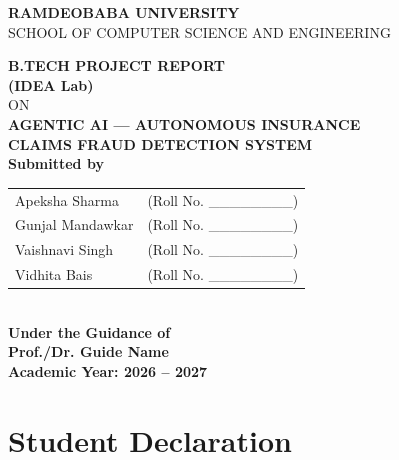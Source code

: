 \documentclass[12pt,a4paper]{article}
\begin{document}
\begin{titlepage}
\centering
\vspace*{1cm}

{\Large\bfseries RAMDEOBABA UNIVERSITY}\\[4pt]
{\large SCHOOL OF COMPUTER SCIENCE AND ENGINEERING}\\[1.5cm]

\begin{figure}[H]
\centering
{}
\end{figure}
\vspace{0.5cm}

{\Large\bfseries B.TECH PROJECT REPORT\\(IDEA Lab)}\\[0.8cm]
ON\\[0.8cm]
{\LARGE\bfseries AGENTIC AI --- AUTONOMOUS INSURANCE\\CLAIMS FRAUD DETECTION SYSTEM}\\[1.5cm]

\textbf{Submitted by}\\[0.4cm]
\begin{tabular}{ll}
Apeksha Sharma   & (Roll No. \_\_\_\_\_\_\_\_) \\
Gunjal Mandawkar & (Roll No. \_\_\_\_\_\_\_\_) \\
Vaishnavi Singh  & (Roll No. \_\_\_\_\_\_\_\_) \\
Vidhita Bais     & (Roll No. \_\_\_\_\_\_\_\_) \\
\end{tabular}\\[1.2cm]

\textbf{Under the Guidance of}\\
\textbf{Prof./Dr. Guide Name}\\[1.5cm]

\textbf{Academic Year: 2026 -- 2027}

\end{titlepage}

\newpage
\section*{Student Declaration}
\end{document}

